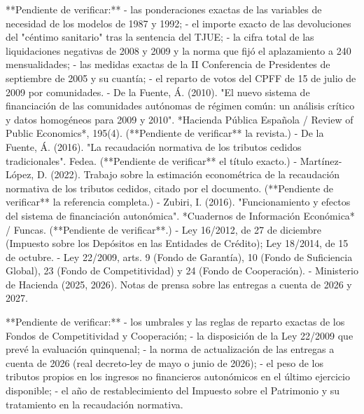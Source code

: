 \documentclass[10pt,a4paper]{article}
\begin{document}
{**Pendiente de verificar:**
- las ponderaciones exactas de las variables de necesidad de los modelos de 1987 y 1992;
- el importe exacto de las devoluciones del "céntimo sanitario" tras la sentencia del TJUE;
- la cifra total de las liquidaciones negativas de 2008 y 2009 y la norma que fijó el aplazamiento a 240 mensualidades;
- las medidas exactas de la II Conferencia de Presidentes de septiembre de 2005 y su cuantía;
- el reparto de votos del CPFF de 15 de julio de 2009 por comunidades.
- De la Fuente, Á. (2010). "El nuevo sistema de financiación de las comunidades autónomas de régimen común: un análisis crítico y datos homogéneos para 2009 y 2010". *Hacienda Pública Española / Review of Public Economics*, 195(4). (**Pendiente de verificar** la revista.)
- De la Fuente, Á. (2016). "La recaudación normativa de los tributos cedidos tradicionales". Fedea. (**Pendiente de verificar** el título exacto.)
- Martínez-López, D. (2022). Trabajo sobre la estimación econométrica de la recaudación normativa de los tributos cedidos, citado por el documento. (**Pendiente de verificar** la referencia completa.)
- Zubiri, I. (2016). "Funcionamiento y efectos del sistema de financiación autonómica". *Cuadernos de Información Económica* / Funcas. (**Pendiente de verificar**.)
- Ley 16/2012, de 27 de diciembre (Impuesto sobre los Depósitos en las Entidades de Crédito); Ley 18/2014, de 15 de octubre.
- Ley 22/2009, arts. 9 (Fondo de Garantía), 10 (Fondo de Suficiencia Global), 23 (Fondo de Competitividad) y 24 (Fondo de Cooperación).
- Ministerio de Hacienda (2025, 2026). Notas de prensa sobre las entregas a cuenta de 2026 y 2027.

**Pendiente de verificar:**
- los umbrales y las reglas de reparto exactas de los Fondos de Competitividad y Cooperación;
- la disposición de la Ley 22/2009 que prevé la evaluación quinquenal;
- la norma de actualización de las entregas a cuenta de 2026 (real decreto-ley de mayo o junio de 2026);
- el peso de los tributos propios en los ingresos no financieros autonómicos en el último ejercicio disponible;
- el año de restablecimiento del Impuesto sobre el Patrimonio y su tratamiento en la recaudación normativa.

}
\end{document}
